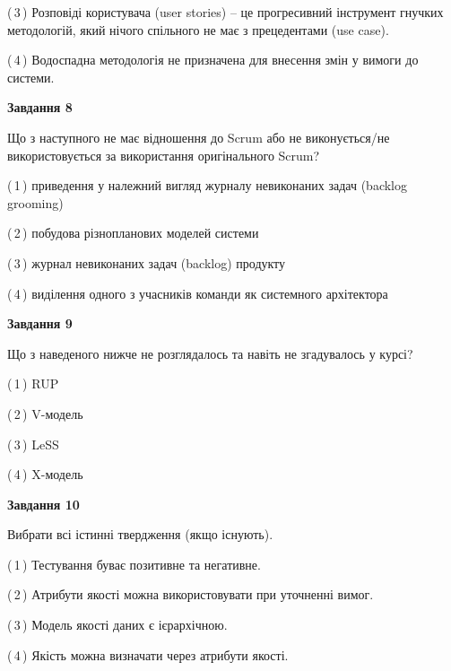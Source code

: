 \documentclass[10pt, ukrainian]{article}
\begin{document}
{\begin {large}
(\,3\,) Розповіді користувача (user stories) – це прогресивний інструмент гнучких методологій, який нічого спільного не має з прецедентами (use case). %



(\,4\,) Водоспадна методологія не призначена для внесення змін у вимоги до системи. %


{\begin {center}\textbf{Завдання 8}\end {center}}\par
Що з наступного не має відношення до Scrum або не виконується/не використовується за використання оригінального Scrum?\par
\vspace{2mm}



(\,1\,) приведення у належний вигляд журналу невиконаних задач (backlog grooming) %



(\,2\,) побудова різнопланових моделей системи%



(\,3\,) журнал невиконаних задач (backlog) продукту%



(\,4\,) виділення одного з учасників команди як системного архітектора%


{\begin {center}\textbf{Завдання 9}\end {center}}\par
Що з наведеного нижче не розглядалось та навіть не згадувалось у курсі?\par
\vspace{2mm}



(\,1\,) RUP%



(\,2\,) V-модель%



(\,3\,) LeSS%



(\,4\,) X-модель%


{\begin {center}\textbf{Завдання 10}\end {center}}\par
Вибрати всі істинні твердження (якщо існують).\par
\vspace{2mm}



(\,1\,) Тестування буває позитивне та негативне.%



(\,2\,) Атрибути якості можна використовувати при уточненні вимог.%



(\,3\,) Модель якості даних є ієрархічною.%



(\,4\,) Якість можна визначати через атрибути якості.%



\end {large}}
\end{document}
